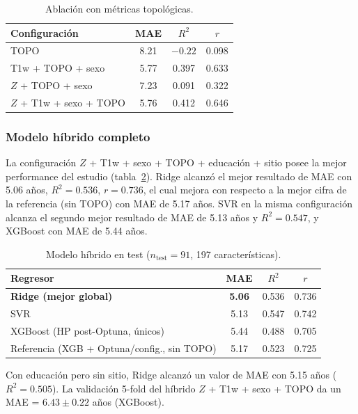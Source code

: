 \documentclass[12pt,a4paper]{article}
\begin{document}
\begin{table}[H]
  \centering
  \caption{Ablación con métricas topológicas.}
  \label{tab:topo_abl}
  \begin{tabular}{lccc}
    \toprule
    Configuración & MAE & $R^2$ & $r$ \\
    \midrule
    TOPO  & 8.21 & $-0.22$ & 0.098 \\
    T1w + TOPO + sexo & 5.77 & 0.397 & 0.633 \\
    $Z$ + TOPO + sexo & 7.23 & 0.091 & 0.322 \\
    $Z$ + T1w + sexo + TOPO & 5.76 & 0.412 & 0.646 \\
    \bottomrule
  \end{tabular}
\end{table}

\subsubsection{Modelo híbrido completo}

La configuración $Z$ + T1w + sexo + TOPO + educación + sitio posee la mejor performance del estudio (tabla~\ref{tab:modelo_full}). Ridge alcanzó el mejor resultado de MAE con 5.06 años, $R^2 = 0.536$, $r = 0.736$, el cual mejora con respecto a la mejor cifra de la referencia\cite{bazan2026} (sin TOPO) con MAE de 5.17 años. SVR en la misma configuración alcanza el segundo mejor resultado de MAE de 5.13 años y $R^2 = 0.547$, y XGBoost con MAE de 5.44 años.

\begin{table}[H]
  \centering
  \caption{Modelo híbrido en test ($n_{\text{test}} = 91$, 197 características).}
  \label{tab:modelo_full}
  \begin{tabular}{lccc}
    \toprule
    Regresor & MAE  & $R^2$ & $r$ \\
    \midrule
    \textbf{Ridge (mejor global)} & \textbf{5.06} & 0.536 & 0.736 \\
    SVR & 5.13 & 0.547 & 0.742 \\
    XGBoost (HP post-Optuna, únicos) & 5.44 & 0.488 & 0.705 \\
    Referencia (XGB + Optuna/config., sin TOPO) & 5.17 & 0.523 & 0.725 \\
    \bottomrule
  \end{tabular}
\end{table}

Con educación pero sin sitio, Ridge alcanzó un valor de MAE con 5.15 años ($R^2 = 0.505$). La validación 5-fold del híbrido $Z$ + T1w + sexo + TOPO da un MAE = $6.43 \pm 0.22$ años (XGBoost).
\end{document}
